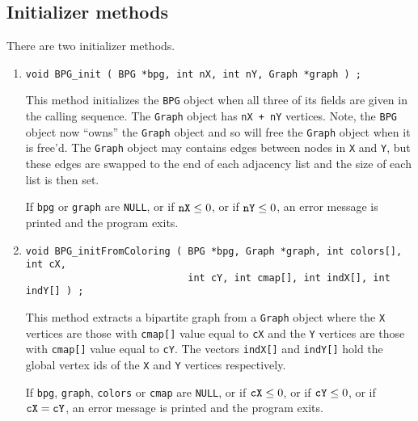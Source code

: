 \subsection{Initializer methods}
\label{subsection:BPG:proto:initializers}
\par
There are two initializer methods.
\par
\begin{enumerate}
\item
\begin{verbatim}
void BPG_init ( BPG *bpg, int nX, int nY, Graph *graph ) ;
\end{verbatim}
This method initializes the {\tt BPG} object when all three of its
fields are given in the calling sequence.
The {\tt Graph} object has {\tt nX + nY} vertices.
Note, the {\tt BPG} object now ``owns'' the {\tt Graph} object and
so will free the {\tt Graph} object when it is free'd.
The {\tt Graph} object may contains edges between nodes in {\tt X}
and {\tt Y}, but these edges are swapped to the end of each
adjacency list and the size of each list is then set.
\par {}
If {\tt bpg} or {\tt graph} are {\tt NULL},
or if ${\tt nX} \le 0$,
or if ${\tt nY} \le 0$,
an error message is printed and the program exits.
\item
\begin{verbatim}
void BPG_initFromColoring ( BPG *bpg, Graph *graph, int colors[], int cX, 
                            int cY, int cmap[], int indX[], int indY[] ) ;
\end{verbatim}
This method extracts a bipartite graph from a {\tt Graph} object where
the {\tt X} vertices are those with {\tt cmap[]} value 
equal to {\tt cX} and the {\tt Y} vertices are those 
with {\tt cmap[]} value equal to {\tt cY}.
The vectors {\tt indX[]} and {\tt indY[]} hold the global vertex
ids of the {\tt X} and {\tt Y} vertices respectively.
\par {}
If {\tt bpg}, {\tt graph}, {\tt colors} or {\tt cmap} are {\tt NULL},
or if ${\tt cX} \le 0$,
or if ${\tt cY} \le 0$,
or if ${\tt cX} = {\tt cY}$,
an error message is printed and the program exits.
\end{enumerate}
\par
